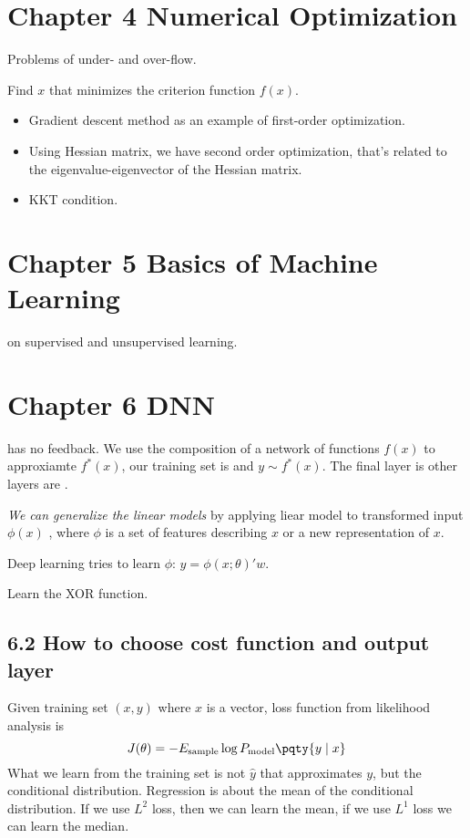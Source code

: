 \section{Chapter 4 Numerical Optimization}
    Problems of under- and over-flow. 
    
    Find \(x\) that minimizes the criterion function \(f(x)\). 
    
    \begin{itemize}
        \item Gradient descent method as an example of first-order optimization.
        \item Using Hessian matrix, we have second order optimization, that's related to the eigenvalue-eigenvector of the Hessian matrix. 
        \item KKT condition. 
    \end{itemize}

\section{Chapter 5 Basics of Machine Learning}
     on supervised and unsupervised learning. 

\section{Chapter 6 DNN}
     has no feedback. We use the composition of a network of functions \(f(x)\) to approxiamte \(f^{*}(x)\), our training set is  and  \(y \sim f^{*}(x)\). The final layer is  other layers are . 
    
    \textit{We can generalize the linear models} by applying liear model to transformed input \(\phi(x)\) , where \(\phi\) is a set of features describing \(x\) or a new representation of \(x\).

    Deep learning tries to learn \(\phi\): 
    \(y =\phi(x; \theta)' w\).

    \begin{example}
        Learn the XOR function. 
    \end{example}
    
    \subsection{6.2 How to choose cost function and output layer}
        Given training set \((x, y)\) where \(x\) is a vector, loss function from likelihood analysis is 
        \begin{equation*}
            J(\theta) = - E_{\text{sample}} \log P_{\text{model}} \pqty{y \mid x}
        \end{equation*}
        What we learn from the training set is not \(\hat{y}\) that approximates \(y\), but the conditional distribution. Regression is about the mean of the conditional distribution. 
        If we use \(L^{2}\) loss, then we can learn the mean, if we use \(L^{1}\) loss we can learn the median. 
        
